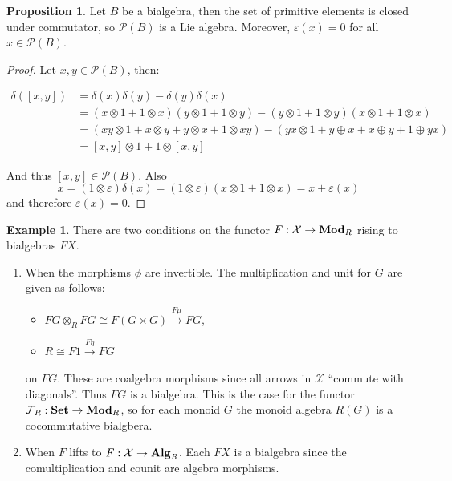 \documentclass[8pt]{article}
\theoremstyle{definition}
\theoremstyle{definition}
\theoremstyle{definition}
\theoremstyle{definition}
\theoremstyle{definition}
\theoremstyle{definition}
\theoremstyle{definition}
\newtheorem{prop}{Proposition}[section]
\theoremstyle{definition}
\theoremstyle{definition}
\theoremstyle{definition}
\theoremstyle{definition}
\theoremstyle{definition}
\newtheorem{example}{Example}[section]
\theoremstyle{definition}
\theoremstyle{definition}
\theoremstyle{question}
\begin{document}
\begin{prop}
  Let $B$ be a bialgebra, then the set of primitive elements is closed under
  commutator, so $\mathcal{P}(B)$ is a Lie algebra. Moreover, $\varepsilon(x) = 0$
  for all $x \in \mathcal{P}(B)$. 
\end{prop}

\begin{proof}
  Let $x, y \in \mathcal{P}(B)$, then:

  \begin{align*}
  \delta([x,y]) &= \delta(x)\delta(y) - \delta(y)\delta(x) \\
        &= (x \otimes 1 + 1 \otimes x)(y \otimes 1 + 1 \otimes y) - (y \otimes 1 + 1 \otimes y) (x \otimes 1 + 1 \otimes x)\\
        &= (xy \otimes 1 + x \otimes y + y \otimes x + 1 \otimes x y) - (yx \otimes 1 + y \oplus x + x \oplus y + 1 \oplus y x) \\
        &= [x, y] \otimes 1 + 1 \otimes [x, y]
  \end{align*}

  And thus $[x, y] \in \mathcal{P}(B)$. Also
  \[
  x = (1 \otimes \varepsilon)\delta(x) = (1 \otimes \varepsilon)(x \otimes 1 + 1 \otimes x) = x + \varepsilon(x)
  \]
  and therefore $\varepsilon(x) = 0$.
\end{proof}

\begin{example}
There are two conditions on the functor $F : \mathcal{X} \to {\bf Mod}_R$ rising
to bialgebras $F X$.

\begin{enumerate}
  \item When the morphisms $\phi$ are invertible. The multiplication and unit for $G$ are given as follows:
  \begin{itemize}
    \item $F G \otimes_R F G \cong F (G \times G) \xrightarrow{F \mu} F G$,
    \item $R \cong F 1 \xrightarrow{F \eta} F G$
  \end{itemize}
  on $F G$. These are coalgebra morphisms since all arrows in $\mathcal{X}$ ``commute with diagonals''.
  Thus $F G$ is a bialgebra. This is the case for the functor $\mathcal{F}_R : {\bf Set} \to {\bf Mod}_R$,
  so for each monoid $G$ the monoid algebra $R(G)$ is a cocommutative bialgbera.
  \item When $F$ lifts to $F : \mathcal{X} \to {\bf Alg}_R$. Each $F X$ is a bialgebra since
  the comultiplication and counit are algebra morphisms. 
\end{enumerate}
\end{example}
\end{document}
